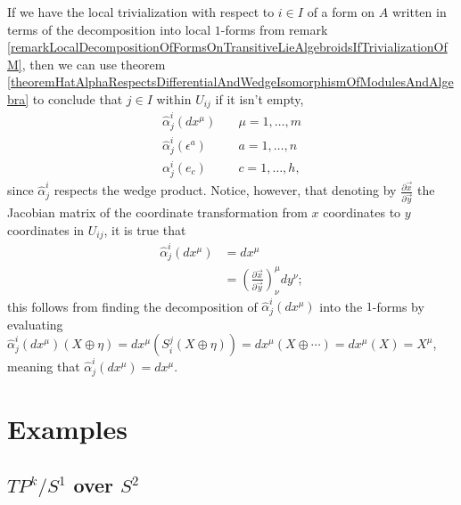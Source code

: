 \begin{remark}\label{remarkSufficesEnoughNeedOnlyHatAlphaFor1FormsToTranslateLocalTrivializations}
If we have the local trivialization with respect to $i \in I$ of a form on $A$ written in terms of the decomposition into local $1$-forms from remark \ref{remarkLocalDecompositionOfFormsOnTransitiveLieAlgebroidsIfTrivializationOfM}, then we can use theorem \ref{theoremHatAlphaRespectsDifferentialAndWedgeIsomorphismOfModulesAndAlgebra} to conclude that  $j \in I$ within $U_{ij}$ if it isn't empty,  
\begin{align}
    \hat \alpha^i_j(dx^\mu)& \quad \mu = 1, \dots, m \\ 
    \hat \alpha^i_j(\epsilon^a)& \quad a = 1, \dots, n \\
    \alpha^i_j(e_c)& \quad c = 1, \dots, h,
\end{align}
since $\hat \alpha^i_j$ respects the wedge product. Notice, however, that denoting by $\frac{\partial \vec x}{\partial \vec y}$ the Jacobian matrix of the coordinate transformation from $x$ coordinates to $y$ coordinates in $U_{ij}$, it is true that
\begin{align}
    \hat \alpha^i_j(dx^\mu) &= dx^\mu \\
    &= \left(\frac{\partial \vec x}{\partial \vec y}\right)^\mu_\nu dy^\nu;
\end{align}
this follows from finding the decomposition of $\hat \alpha^i_j(dx^\mu)$ into the $1$-forms by evaluating $\hat \alpha^i_j(dx^\mu)(X \oplus \eta) = dx^\mu(S^j_i(X \oplus \eta)) = dx^\mu(X \oplus \cdots) = dx^\mu(X) = X^\mu$, meaning that $\hat \alpha^i_j (dx^\mu) = dx^\mu$.
\end{remark}

\section{Examples}
\label{ChFormsSectionExamples}

\subsection{$TP^k/S^1$ over $S^2$} \label{exampleTransitionALphaFormsPk}

